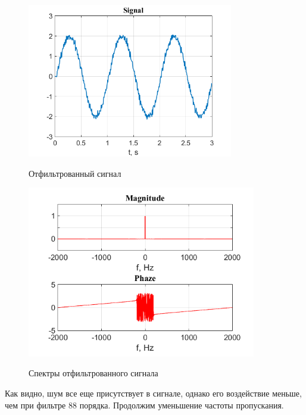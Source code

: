 \documentclass[a4paper,14pt]{article}
\begin{document}
\newpage
\begin{figure}[h]
	\begin{multicols}{1}
		\hfill
		\includegraphics[width=90mm]{filtered2}
		\hfill
		\caption{Отфильтрованный сигнал}
		\label{figBottom}
		\hfill
		\includegraphics[width=100mm]{filtered_spec2}
		\hfill
		\caption{Спектры отфильтрованного сигнала}
		\label{figDown}
	\end{multicols}
\end{figure}

\hspace{0,5cm} Как видно, шум все еще присутствует в сигнале, однако его воздействие меньше, чем при фильтре $88$ порядка. Продолжим уменьшение частоты пропускания.
\end{document}

